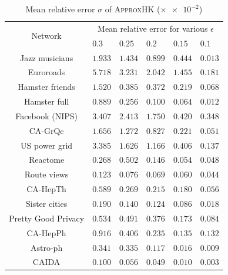 \documentclass[10pt,twocolumn,twoside]{IEEEtran}
\begin{document}
\begin{table}[htbp]
    \tabcolsep=8pt
    \centering
    \fontsize{8.0}{8.8}\selectfont
    \begin{threeparttable}
        \caption{Mean relative error \(\sigma\) of \textsc{ApproxHK} (\(\times \num{e-2}\))} %
        \label{tab:accuracy}
        \begin{tabularx}{8.5cm}{c p{0.5cm} p{0.5cm} p{0.5cm} p{0.5cm} p{0.5cm}}
            \toprule[1pt]
            \multirow{2}{*}{Network} &
            \multicolumn{5}{c}{Mean relative error for various \(\epsilon\)}                     \\
            \cmidrule{2-6}
                                     & \(0.3\)   & \(0.25\)  & \(0.2\)   & \(0.15\)  & \(0.1\)   \\
            \midrule
            Jazz musicians           & \(1.933\) & \(1.434\) & \(0.899\) & \(0.444\) & \(0.013\) \\
            Euroroads                & \(5.718\) & \(3.231\) & \(2.042\) & \(1.455\) & \(0.181\) \\
            Hamster friends          & \(1.520\) & \(0.385\) & \(0.372\) & \(0.219\) & \(0.068\) \\
            Hamster full             & \(0.889\) & \(0.256\) & \(0.100\) & \(0.064\) & \(0.012\) \\
            Facebook (NIPS)          & \(3.407\) & \(2.413\) & \(1.750\) & \(0.420\) & \(0.348\) \\
            CA-GrQc                  & \(1.656\) & \(1.272\) & \(0.827\) & \(0.221\) & \(0.051\) \\
            US power grid            & \(3.385\) & \(1.626\) & \(1.166\) & \(0.406\) & \(0.137\) \\
            Reactome                 & \(0.268\) & \(0.502\) & \(0.146\) & \(0.054\) & \(0.048\) \\
            Route views              & \(0.123\) & \(0.076\) & \(0.069\) & \(0.060\) & \(0.044\) \\
            CA-HepTh                 & \(0.589\) & \(0.269\) & \(0.215\) & \(0.180\) & \(0.056\) \\
            Sister cities            & \(0.190\) & \(0.140\) & \(0.124\) & \(0.086\) & \(0.018\) \\
            Pretty Good Privacy      & \(0.534\) & \(0.491\) & \(0.376\) & \(0.173\) & \(0.084\) \\
            CA-HepPh                 & \(0.916\) & \(0.406\) & \(0.235\) & \(0.135\) & \(0.132\) \\
            Astro-ph                 & \(0.341\) & \(0.335\) & \(0.117\) & \(0.016\) & \(0.009\) \\
            CAIDA                    & \(0.100\) & \(0.056\) & \(0.049\) & \(0.010\) & \(0.003\) \\
            \bottomrule
        \end{tabularx}
    \end{threeparttable}
\end{table}
\end{document}
